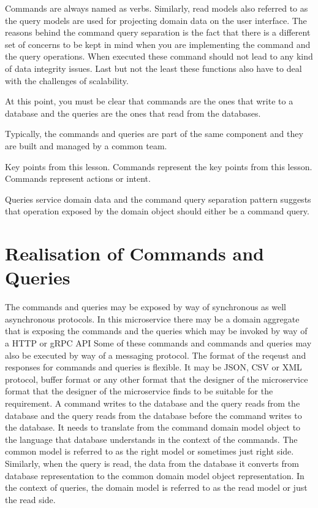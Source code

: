 Commands are always named as verbs.
Similarly, read models also referred to as the query models are used for projecting domain data on the user interface.
The reasons behind the command query separation is the fact that there is a different set of concerns to be kept in mind when you are implementing the command and the query operations.
When executed these command should not lead to any kind of data integrity issues.
Last but not the least these functions also have to deal with the challenges of scalability.

At this point, you must be clear that commands are the ones that write to a database and the queries are the ones that read from the databases.

Typically, the commands and queries are part of the same component and they are built and managed by a common team.

Key points from this lesson.
Commands represent the key points from this lesson.
Commands represent actions or intent.

Queries service domain data and the command query separation pattern suggests that operation exposed by the domain object should either be a command query.


\section{Realisation of Commands and Queries}

The commands and queries may be exposed by way of synchronous as well asynchronous protocols.
In this microservice there may be a domain aggregate that is exposing the commands and the queries which may be invoked by way of a HTTP or gRPC API
Some of these commands and commands and queries may also be executed by way of a messaging protocol.
The format of the reqeust and responses for commands and queries is flexible.
It may be JSON, CSV or XML protocol, buffer format or any other format that the designer of the microservice format that the designer of the microservice finds to be suitable for the requirement.
A command writes to the database and the query reads from the database and the query reads from the database before the command writes to the database.
It needs to translate from the command domain model object to the language that database understands in the context of the commands.
The common model is referred to as the right model or sometimes just right side.
Similarly, when the query is read, the data from the database it converts from database representation to the common domain model object representation.
In the context of queries, the domain model is referred to as the read model or just the read side.

